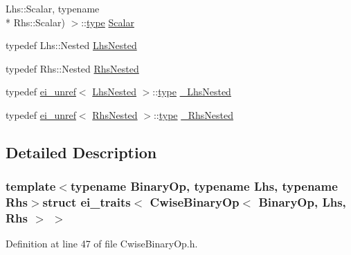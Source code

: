 \begin{DoxyCompactItemize}
Lhs\-::\-Scalar, typename \\*
Rhs\-::\-Scalar) $>$\-::\hyperlink{glext_8h_a7d05960f4f1c1b11f3177dc963a45d86}{type} \hyperlink{structei__traits_3_01_cwise_binary_op_3_01_binary_op_00_01_lhs_00_01_rhs_01_4_01_4_ab9a2ab6f8760a4b4f31dc6c4488c3f62}{Scalar}
\item 
typedef Lhs\-::\-Nested \hyperlink{structei__traits_3_01_cwise_binary_op_3_01_binary_op_00_01_lhs_00_01_rhs_01_4_01_4_a45767979a6f13e5e60300f1043a39eea}{Lhs\-Nested}
\item 
typedef Rhs\-::\-Nested \hyperlink{structei__traits_3_01_cwise_binary_op_3_01_binary_op_00_01_lhs_00_01_rhs_01_4_01_4_a3e3befd415499f8cc9996a3a18273f95}{Rhs\-Nested}
\item 
typedef \hyperlink{structei__unref}{ei\-\_\-unref}$<$ \hyperlink{structei__traits_3_01_cwise_binary_op_3_01_binary_op_00_01_lhs_00_01_rhs_01_4_01_4_a45767979a6f13e5e60300f1043a39eea}{Lhs\-Nested} $>$\-::\hyperlink{glext_8h_a7d05960f4f1c1b11f3177dc963a45d86}{type} \hyperlink{structei__traits_3_01_cwise_binary_op_3_01_binary_op_00_01_lhs_00_01_rhs_01_4_01_4_a8d4bc0c828c39597315c44cbca2d5c0a}{\-\_\-\-Lhs\-Nested}
\item 
typedef \hyperlink{structei__unref}{ei\-\_\-unref}$<$ \hyperlink{structei__traits_3_01_cwise_binary_op_3_01_binary_op_00_01_lhs_00_01_rhs_01_4_01_4_a3e3befd415499f8cc9996a3a18273f95}{Rhs\-Nested} $>$\-::\hyperlink{glext_8h_a7d05960f4f1c1b11f3177dc963a45d86}{type} \hyperlink{structei__traits_3_01_cwise_binary_op_3_01_binary_op_00_01_lhs_00_01_rhs_01_4_01_4_ab21c2e3b42e050b6613140088a1bf9da}{\-\_\-\-Rhs\-Nested}
\end{DoxyCompactItemize}


\subsection{Detailed Description}
\subsubsection*{template$<$typename Binary\-Op, typename Lhs, typename Rhs$>$struct ei\-\_\-traits$<$ Cwise\-Binary\-Op$<$ Binary\-Op, Lhs, Rhs $>$ $>$}



Definition at line 47 of file Cwise\-Binary\-Op.\-h.



